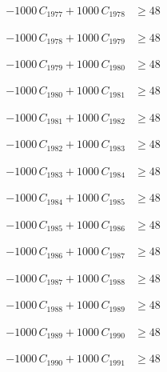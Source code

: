 \documentclass[a4paper,11pt]{article}
\begin{document}
\begin{align}
-1000\,C_{1977} + 1000\,C_{1978} &\geq 48 \nonumber
\end{align}

\begin{align}
-1000\,C_{1978} + 1000\,C_{1979} &\geq 48 \nonumber
\end{align}

\begin{align}
-1000\,C_{1979} + 1000\,C_{1980} &\geq 48 \nonumber
\end{align}

\begin{align}
-1000\,C_{1980} + 1000\,C_{1981} &\geq 48 \nonumber
\end{align}

\begin{align}
-1000\,C_{1981} + 1000\,C_{1982} &\geq 48 \nonumber
\end{align}

\begin{align}
-1000\,C_{1982} + 1000\,C_{1983} &\geq 48 \nonumber
\end{align}

\begin{align}
-1000\,C_{1983} + 1000\,C_{1984} &\geq 48 \nonumber
\end{align}

\begin{align}
-1000\,C_{1984} + 1000\,C_{1985} &\geq 48 \nonumber
\end{align}

\begin{align}
-1000\,C_{1985} + 1000\,C_{1986} &\geq 48 \nonumber
\end{align}

\begin{align}
-1000\,C_{1986} + 1000\,C_{1987} &\geq 48 \nonumber
\end{align}

\begin{align}
-1000\,C_{1987} + 1000\,C_{1988} &\geq 48 \nonumber
\end{align}

\begin{align}
-1000\,C_{1988} + 1000\,C_{1989} &\geq 48 \nonumber
\end{align}

\begin{align}
-1000\,C_{1989} + 1000\,C_{1990} &\geq 48 \nonumber
\end{align}

\begin{align}
-1000\,C_{1990} + 1000\,C_{1991} &\geq 48 \nonumber
\end{align}
\end{document}
